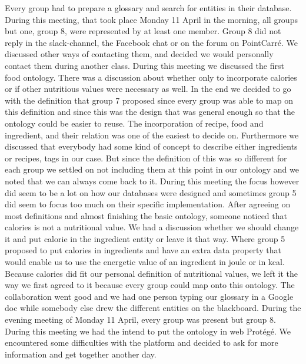 Every group had to prepare a glossary and search for entities in their database. During this meeting, that took place Monday 11 April in the morning, all groups but one, group 8, were represented by at least one member. Group 8 did not reply in the slack-channel, the Facebook chat or on the forum on PointCarr\'e. We discussed other ways of contacting them, and decided we would personally contact them during another class. During this meeting we discussed the first food ontology. There was a discussion about whether only to incorporate calories or if other nutritious values were necessary as well. In the end we decided to go with the definition that group 7 proposed since every group was able to map on this definition and since this was the design that was general enough so that the ontology could be easier to reuse. The incorporation of recipe, food and ingredient, and their relation was one of the easiest to decide on. Furthermore we discussed that everybody had some kind of concept to describe either ingredients or recipes, tags in our case. But since the definition of this was so different for each group we settled on not including them at this point in our ontology and we noted that we can always come back to it. During this meeting the focus however did seem to be a lot on how our databases were designed and sometimes group 5 did seem to focus too much on their specific implementation. After agreeing on most definitions and almost finishing the basic ontology, someone noticed that calories is not a nutritional value. We had a discussion whether we should change it and put calorie in the ingredient entity or leave it that way. Where group 5 proposed to put calories in ingredients and have an extra data property that would enable us to use the energetic value of an ingredient in joule or in kcal. Because calories did fit our personal definition of nutritional values, we left it the way we first agreed to it because every group could map onto this ontology. The collaboration went good and we had one person typing our glossary in a Google doc while somebody else drew the different entities on the blackboard. 
\newline
\newline
\noindent
During the evening meeting of Monday 11 April, every group was present but group 8. During this meeting we had the intend to put the ontology in web Protégé. We encountered some difficulties with the platform and decided to ask for more information and get together another day. 
\newline
\newline
